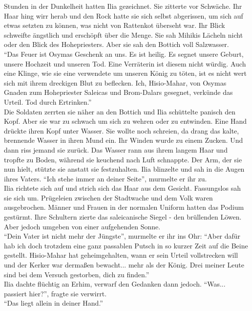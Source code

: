 Stunden in der Dunkelheit hatten Ilia gezeichnet. Sie zitterte vor Schwäche. Ihr Haar hing wirr 
herab und den Rock hatte sie sich selbst abgerissen, um sich auf etwas setzten zu können, was nicht 
von Rattenkot überseht war. Ihr Blick schweifte ängstlich und erschöpft über die Menge. Sie sah 
Mihikis Lächeln nicht oder den Blick des Hohepriesters. Aber sie sah den Bottich voll Salzwasser.\\
``Das Feuer ist Osymas Geschenk an uns. Es ist heilig. Es segnet unsere Geburt, unsere Hochzeit und 
unseren Tod. Eine Verräterin ist diesem nicht würdig. Auch eine Klinge, wie sie eine verwendete um 
unseren König zu töten, ist es nicht wert sich mit ihrem dreckigen Blut zu beflecken. Ich, 
Hisio-Mahar, von Osymas Gnaden zum Hohepriester Saleicas und Brom-Dalars gesegnet, verkünde das 
Urteil. Tod durch Ertrinken.''\\
Die Soldaten zerrten sie näher an den Bottich und Ilia schüttelte panisch den Kopf. Aber sie war zu 
schwach um sich zu wehren oder zu entwinden. Eine Hand drückte ihren Kopf unter Wasser. Sie wollte 
noch schreien, da drang das kalte, brennende Wasser in ihren Mund ein. Ihr Winden wurde zu 
einem Zucken. Und dann riss jemand sie zurück. Das Wasser rann aus ihrem langem Haar und tropfte zu 
Boden, während sie keuchend nach Luft schnappte. Der Arm, der sie nun hielt, stützte sie anstatt 
sie festzuhalten. Ilia blinzelte und sah in die Augen ihres Vaters. ``Ich stehe immer an deiner 
Seite'', murmelte er ihr zu.\\
Ilia richtete sich auf und strich sich das Haar aus dem Gesicht. Fassungslos sah sie sich um. 
Prügeleien zwischen der Stadtwache und dem Volk waren ausgebrochen. Männer und Frauen in der 
normalen Uniform hatten das Podium gestürmt. Ihre Schultern zierte das saleicanische Siegel - den 
brüllenden Löwen. Aber jedoch umgeben von einer aufgehenden Sonne.\\
``Dein Vater ist nicht mehr der Jüngste'', murmelte er ihr ins Ohr: ``Aber dafür hab ich doch 
trotzdem eine ganz passablen Putsch in so kurzer Zeit auf die Beine gestellt. Hisio-Mahar hat 
geheimgehalten, wann er sein Urteil vollstrecken will und der Kerker war dermaßen bewacht... mehr 
als der König. Drei meiner Leute sind bei dem Versuch gestorben, dich zu finden.''\\
Ilia dachte flüchtig an Erhim, verwarf den Gedanken dann jedoch. ``Was... passiert hier?'', fragte 
sie verwirrt.\\
``Das liegt allein in deiner Hand.''\\
